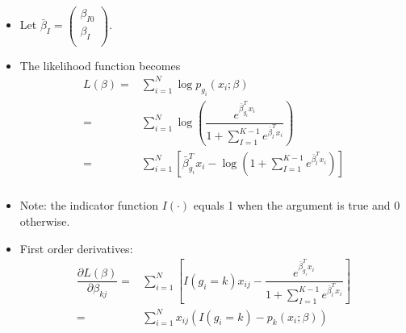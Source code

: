 \documentclass[12pt,notes,mathserif]{beamer}
\begin{document}
\begin{frame}[c]
	\frametitle{}
	\begin{itemize}
		\item Let $\bar{\beta}_I=\begin{pmatrix}
				      \beta_{I0} \\
				      \beta_{I}  \\
			      \end{pmatrix}$.
		\item The likelihood function becomes
		      \begin{align*}
			      L(\beta)= & \sum\limits_{i=1}^{N}\log p_{g_i}(x_i;\beta)                                                                           \\
			      =         & \sum\limits_{i=1}^{N} \log \left(\dfrac{e^{\bar{\beta}_{g_i}^Tx_i}}{1+\sum_{I=1}^{K-1}e^{\bar{\beta}_{l}^Tx_i}}\right) \\
			      =         & \sum\limits_{i=1}^{N}
			      \left[\bar{\beta}_{g_i}^Tx_i-
				      \log \left(1+\sum_{I=1}^{K-1}e^{\bar{\beta}_{l}^Tx_i}\right)
				      \right]
		      \end{align*}
	\end{itemize}
\end{frame}

\begin{frame}[c]
	\frametitle{}
	\begin{itemize}
		\item Note: the indicator function $I(\cdot )$ equals 1 when the argument is true and 0 otherwise.
		\item  First order derivatives:
		      \begin{align*}
			      \dfrac{\partial L(\beta )}{\partial\beta_{kj}}= &
			      \sum\limits_{i=1}^{N}\left[
			      I(g_i=k)x_{ij}-\dfrac{e^{\bar{\beta}_{g_i}^Tx_i}}{1+\sum_{I=1}^{K-1}e^{\bar{\beta}_{l}^Tx_i}}
			      \right]                                                                                                \\
			      =                                               & \sum\limits_{i=1}^{N}x_{ij}(I(g_i=k)-p_k(x_i;\beta))
		      \end{align*}
	\end{itemize}
\end{frame}
\end{document}
